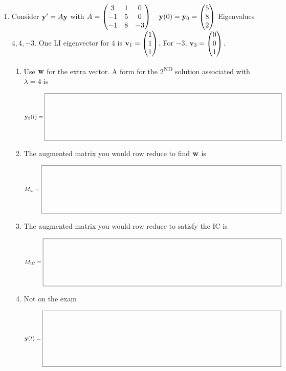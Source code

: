 \documentclass[11pt,letterpaper]{article}
\newcommand{\workbox}[2]{%
  \vcenter{\hbox{$\boxed{\rule{0pt}{#2}\makebox[#1]{}}$}}}
\begin{document}
\begin{enumerate}
\item Consider $\mathbf{y}'=A\mathbf{y}$ with
$A=\begin{pmatrix}3&1&0\\-1&5&0\\-1&8&-3\end{pmatrix}\quad \mathbf{y}(0)=\mathbf{y}_0=\begin{pmatrix}5\\8\\2\end{pmatrix}$\newline
Eigenvalues $4,4,-3$. \quad One LI eigenvector for $4$ is $\mathbf{v}_1=\begin{pmatrix}1\\1\\1\end{pmatrix}$. \quad For $-3$, $\mathbf{v}_3=\begin{pmatrix}0\\0\\1\end{pmatrix}$.
\begin{enumerate}
\item Use $\mathbf{w}$ for the extra vector. A form for the 2\textsuperscript{ND} solution associated with $\lambda=4$ is
\par $\vect{y}_2(t)=\workbox{5.65in}{1.05in}$
\vfill
\item The augmented matrix you would row reduce to find $\mathbf{w}$ is
\par $M_w=\workbox{5.65in}{1.05in}$
\vfill
\item The augmented matrix you would row reduce to satisfy the IC is
\par $M_{\mathrm{IC}}=\workbox{5.65in}{1.05in}$
\vfill
\item Not on the exam
\par $\vect{y}(t)=\workbox{5.65in}{1.25in}$
\end{enumerate}


\end{enumerate}
\end{document}
